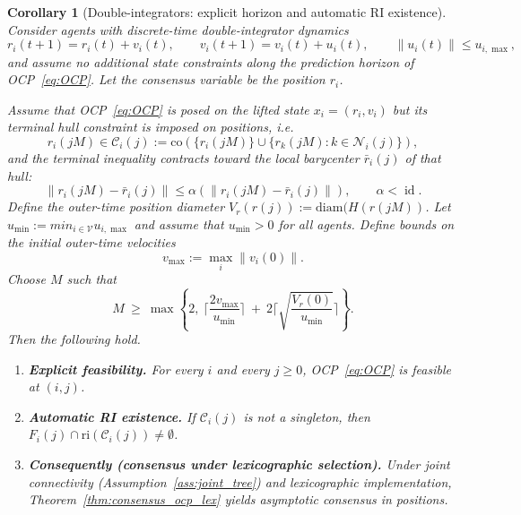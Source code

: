 \documentclass[12pt,draftcls,onecolumn]{IEEEtran}
\newtheorem{corollary}{Corollary}
\DeclareMathOperator{\id}{id}
\def\V{\mathcal{V}}
\def\C{\mathcal{C}}
\def\diam{\mathrm{diam}}
\def\ri{\mathrm{ri}}
\def\co{\mathrm{co}}
\begin{document}
\begin{corollary}[Double-integrators: explicit horizon and automatic RI existence]\label{cor:double_integrator_explicit}
Consider agents with discrete-time double-integrator dynamics
\begin{equation}\label{eq:di}
r_i(t{+}1)=r_i(t)+v_i(t),\qquad v_i(t{+}1)=v_i(t)+u_i(t),
\qquad \|u_i(t)\|\le u_{i,\max},
\end{equation}
and assume no additional state constraints along the prediction horizon of OCP~\eqref{eq:OCP}.
Let the consensus variable be the \emph{position} $r_i$.

Assume that OCP~\eqref{eq:OCP} is posed on the lifted state $x_i=(r_i,v_i)$ but its terminal hull constraint
is imposed on positions, i.e.
\[
r_i(jM)\in \C_i(j):=\co(\{r_i(jM)\}\cup\{r_k(jM):k\in\mathcal N_i(j)\}),
\]
and the terminal inequality contracts toward the local barycenter $\bar r_i(j)$ of that hull:
\[
\|r_i(jM)-\bar r_i(j)\|\le \alpha(\|r_i(jM)-\bar r_i(j)\|),\qquad \alpha<\id.
\]
Define the outer-time position diameter $V_r(r(j)):=\diam(H(r(jM))$.
Let $u_{\min} := min_{i\in\V} u_{i,\max}$ and assume that $u_{\min}>0$ for all agents.
Define bounds on the initial outer-time velocities
\[
v_{\max}:=\max_{i}\|v_i(0)\|.
\]
Choose $M$ such that
\begin{equation}\label{eq:M_DI}
M\ \ge\ \max\!\left\{2,\ \Big\lceil \frac{2v_{\max}}{u_{\min}}\Big\rceil
\ +\ 2\Big\lceil \sqrt{\frac{V_r(0)}{u_{\min}}}\Big\rceil\right\}.
\end{equation}
Then the following hold.
\begin{enumerate}
\item[(a)] \textbf{Explicit feasibility.} For every $i$ and every $j\ge 0$, OCP~\eqref{eq:OCP} is feasible at $(i,j)$.
\item[(b)] \textbf{Automatic RI existence.} If $\C_i(j)$ is not a singleton, then $F_i(j)\cap\ri(\C_i(j))\neq\emptyset$.
\item[(c)] \textbf{Consequently (consensus under lexicographic selection).}
Under joint connectivity (Assumption~\ref{ass:joint_tree}) and lexicographic implementation, Theorem~\ref{thm:consensus_ocp_lex} yields asymptotic consensus in positions.
\end{enumerate}
\end{corollary}
\end{document}

